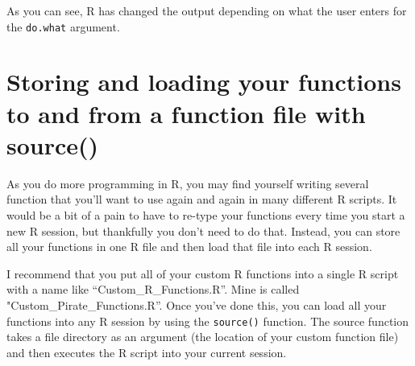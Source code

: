 \documentclass{tufte-book}\usepackage[]{graphicx}\usepackage[]{color}
\begin{document}
\begin{footnotesize}
As you can see, R has changed the output depending on what the user enters for the \texttt{do.what} argument.
% 
% 
%   
%   
%   
%     
%   
%   
%   
%     
%   
%   
% 
% 



\section{Storing and loading your functions to and from a function file with source()}

As you do more programming in R, you may find yourself writing several function that you'll want to use again and again in many different R scripts. It would be a bit of a pain to have to re-type your functions every time you start a new R session, but thankfully you don't need to do that. Instead, you can store all your functions in one R file and then load that file into each R session. 

I recommend that you put all of your custom R functions into a single R script with a name like ``Custom\_R\_Functions.R''. Mine is called "Custom\_Pirate\_Functions.R''. Once you've done this, you can load all your functions into any R session by using the \texttt{source()} function. The source function takes a file directory as an argument (the location of your custom function file) and then executes the R script into your current session.


\end{footnotesize}
\end{document}

